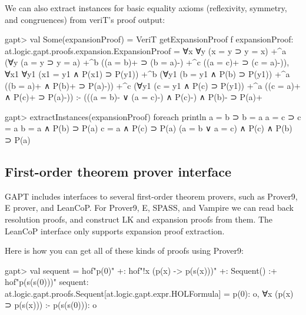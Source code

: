 \documentclass[a4paper,11pt]{article}
\begin{document}
We can also extract instances for basic equality axioms (reflexivity, symmetry,
and congruences) from veriT's proof output:
\begin{clilisting}
gapt> val Some(expansionProof) = VeriT getExpansionProof f
expansionProof: at.logic.gapt.proofs.expansion.ExpansionProof =
∀x ∀y (x = y ⊃ y = x)
  +^{a}
    (∀y (a = y ⊃ y = a)
      +^{b} ((a = b)+ ⊃ (b = a)-)
      +^{c} ((a = c)+ ⊃ (c = a)-)),
∀x1 ∀y1 (x1 = y1 ∧ P(x1) ⊃ P(y1))
  +^{b} (∀y1 (b = y1 ∧ P(b) ⊃ P(y1)) +^{a} ((b = a)+ ∧ P(b)+ ⊃ P(a)-))
  +^{c} (∀y1 (c = y1 ∧ P(c) ⊃ P(y1)) +^{a} ((c = a)+ ∧ P(c)+ ⊃ P(a)-))
:-
(((a = b)- ∨ (a = c)-) ∧ P(c)-) ∧ P(b)- ⊃ P(a)+

gapt> extractInstances(expansionProof) foreach println
a = b ⊃ b = a
a = c ⊃ c = a
b = a ∧ P(b) ⊃ P(a)
c = a ∧ P(c) ⊃ P(a)
(a = b ∨ a = c) ∧ P(c) ∧ P(b) ⊃ P(a)

\end{clilisting}

\subsection{First-order theorem prover interface}

GAPT includes interfaces to several first-order theorem provers, such as
Prover9, E prover, and LeanCoP.  For Prover9, E, SPASS, and Vampire we can read back
resolution proofs, and construct LK and expansion proofs from them.  The
LeanCoP interface only supports expansion proof extraction.

Here is how you can get all of these kinds of proofs using Prover9:
\begin{clilisting}
gapt> val sequent = hof"p(0)" +: hof"!x (p(x) -> p(s(x)))" +: Sequent() :+ hof"p(s(s(0)))"
sequent: at.logic.gapt.proofs.Sequent[at.logic.gapt.expr.HOLFormula] = p(0): o, ∀x (p(x) ⊃ p(s(x))) :- p(s(s(0))): o

\end{clilisting}
\end{document}
